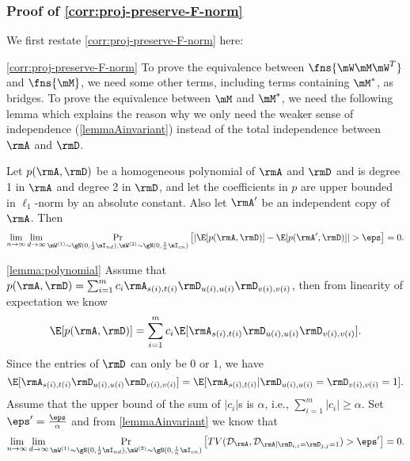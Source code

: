 \subsubsection{Proof of \cref{corr:proj-preserve-F-norm}}
\label{proof-proj-preserve-F-norm}
We first restate \cref{corr:proj-preserve-F-norm} here:
\lemmaProjPreserveNorm*
\begin{proofof}{\cref{corr:proj-preserve-F-norm}}
To prove the equivalence between $\fns{\mW\mM\mW^T}$ and $\fns{\mM}$, we need some other terms, including terms containing $\mM^*$, as bridges. To prove the equivalence between $\mM$ and $\mM^*$, we need the following lemma which explains the reason why we only need the weaker sense of independence (\cref{lemmaAinvariant}) instead of the total independence between $\rmA$ and $\rmD$.
\begin{lemma}
\label{lemma:polynomial}
Let $p(\rmA,\rmD)$ be a homogeneous polynomial of $\rmA$ and $\rmD$ and is degree 1 in $\rmA$ and degree 2 in $\rmD$, and let the coefficients in $p$ are upper bounded in $\ell_1$-norm by an absolute constant. Also let $\rmA'$ be an independent copy of $\rmA$. Then
\begin{equation}
    \lim_{n\to\infty}\lim_{d\to \infty}\mathop{\Pr}_{\mW^{(1)}\sim\gN(0,\frac{1}{d}\mI_{nd}), \mW^{(2)}\sim\gN(0,\frac{1}{n}\mI_{cn})}\left[|\E[p(\rmA,\rmD)]-\E[p(\rmA',\rmD)]|>\eps\right] = 0.
\end{equation}
\end{lemma}
\begin{proofof}{\cref{lemma:polynomial}}
Assume that $p(\rmA,\rmD)=\sum_{i=1}^m c_i\rmA_{s(i),t(i)}\rmD_{u(i),u(i)}\rmD_{v(i),v(i)}$, then from linearity of expectation we know
\begin{equation}
    \E[p(\rmA,\rmD)] = \sum_{i=1}^m c_i\E[\rmA_{s(i),t(i)}\rmD_{u(i),u(i)}\rmD_{v(i),v(i)}].
\end{equation}
Since the entries of $\rmD$ can only be $0$ or $1$, we have
\begin{equation}
    \E[\rmA_{s(i),t(i)}\rmD_{u(i),u(i)}\rmD_{v(i),v(i)}] = \E[\rmA_{s(i),t(i)}|\rmD_{u(i),u(i)}=\rmD_{v(i),v(i)}=1].
\end{equation}
Assume that the upper bound of the sum of $|c_i|$s is $\alpha$, i.e., $\sum_{i=1}^m|c_i|\geq \alpha$. Set $\eps'=\frac{\eps}{\alpha}$ and from \cref{lemmaAinvariant} we know that
\begin{equation}
    \lim_{n\to\infty}\lim_{d\to \infty}\mathop{\Pr}_{\mW^{(1)}\sim\gN(0,\frac{1}{d}\mI_{nd}), \mW^{(2)}\sim\gN(0,\frac{1}{n}\mI_{cn})}\left[TV(\mathcal{D}_{\rmA},\mathcal{D}_{\rmA|\rmD_{i,i}=\rmD_{j,j}=1})>\eps'\right] = 0.

\end{equation}
\end{proofof}
\end{proofof}
